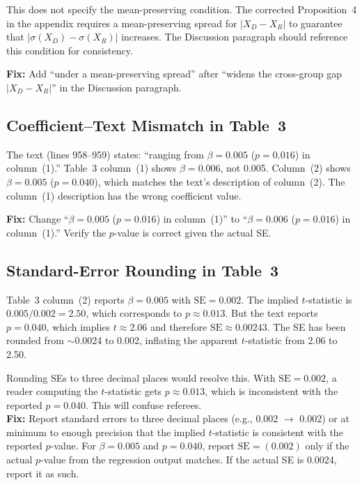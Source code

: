 \documentclass[11pt]{article}
\begin{document}
This does not specify the mean-preserving condition. The corrected Proposition~4 in the appendix requires a mean-preserving spread for $|X_D - X_R|$ to guarantee that $|\sigma(X_D) - \sigma(X_R)|$ increases. The Discussion paragraph should reference this condition for consistency.

\begin{criticalbox}
\textbf{Fix:} Add ``under a mean-preserving spread'' after ``widens the cross-group gap $|X_D - X_R|$'' in the Discussion paragraph.
\end{criticalbox}

\subsection{Coefficient--Text Mismatch in Table~3}

The text (lines 958--959) states: ``ranging from $\beta = 0.005$ ($p = 0.016$) in column~(1).'' Table~3 column~(1) shows $\beta = 0.006$, not 0.005. Column~(2) shows $\beta = 0.005$ ($p = 0.040$), which matches the text's description of column~(2). The column~(1) description has the wrong coefficient value.

\begin{criticalbox}
\textbf{Fix:} Change ``$\beta = 0.005$ ($p = 0.016$) in column~(1)'' to ``$\beta = 0.006$ ($p = 0.016$) in column~(1).'' Verify the $p$-value is correct given the actual SE.
\end{criticalbox}

\subsection{Standard-Error Rounding in Table~3}

Table~3 column~(2) reports $\beta = 0.005$ with $\text{SE} = 0.002$. The implied $t$-statistic is $0.005/0.002 = 2.50$, which corresponds to $p \approx 0.013$. But the text reports $p = 0.040$, which implies $t \approx 2.06$ and therefore $\text{SE} \approx 0.00243$. The SE has been rounded from $\sim$0.0024 to 0.002, inflating the apparent $t$-statistic from 2.06 to 2.50.

\begin{majorbox}
Rounding SEs to three decimal places would resolve this. With $\text{SE} = 0.002$, a reader computing the $t$-statistic gets $p \approx 0.013$, which is inconsistent with the reported $p = 0.040$. This will confuse referees.\\[4pt]
\textbf{Fix:} Report standard errors to three decimal places (e.g., 0.002 $\to$ 0.002) or at minimum to enough precision that the implied $t$-statistic is consistent with the reported $p$-value. For $\beta = 0.005$ and $p = 0.040$, report $\text{SE} = (0.002)$ only if the actual $p$-value from the regression output matches. If the actual SE is 0.0024, report it as such.
\end{majorbox}
\end{document}
